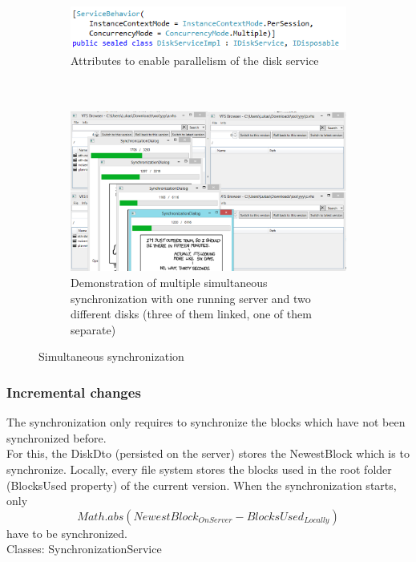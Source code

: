 \documentclass[JCDReport.tex]{subfiles}
\begin{document}
\begin{figure}[h!]
	\begin{subfigure}[b]{1\textwidth}
		\centering
		\includegraphics[scale=1]{Images/parallel_sync1.png} 
		\caption{Attributes to enable parallelism of the disk service\\\ \\\ \\} %
	\end{subfigure}
	
	\begin{subfigure}[b]{1\textwidth}
		\centering
		\includegraphics[scale=0.5]{Images/parallel_sync2.png} 
		\caption{Demonstration of multiple simultaneous synchronization with one running server and two different disks (three of them linked, one of them separate)}
	\end{subfigure}
	
	\caption{Simultaneous synchronization}
\end{figure}

\subsubsection{Incremental changes}
The synchronization only requires to synchronize the blocks which have not been synchronized before.\\
For this, the DiskDto (persisted on the server) stores the NewestBlock which is to synchronize. Locally, every file system stores the blocks used in the root folder (BlocksUsed property) of the current version. When the synchronization starts, only $$Math.abs(NewestBlock_{OnServer}-BlocksUsed_{Locally})$$ have to be synchronized.\\
Classes: SynchronizationService
\end{document}
